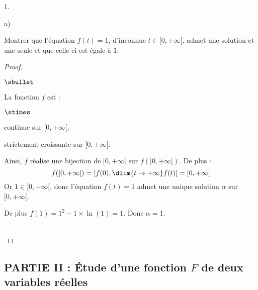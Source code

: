 \documentclass[11pt]{article}%
\begin{document}
\begin{noliste}{1.}
\begin{noliste}{a)}
\end{noliste}

\item Montrer que l'équation $f(t)=1$, d'inconnue $t\in[0,+\infty[$, 
admet une solution et une seule et que celle-ci est égale à $1$.

\begin{proof}~%
  \begin{noliste}{$\sbullet$}
  \item La fonction $f$ est :
    \begin{noliste}{$\stimes$}
    \item continue sur $[0,+\infty[$,
    \item strictement croissante sur $[0,+\infty[$.
    \end{noliste}
    Ainsi, $f$ réalise une bijection de $[0,+\infty[$ sur
    $f([0,+\infty[)$. De plus :
    \[
    f([0,+\infty[) = \left[f(0), \dlim{t\to+\infty} f(t)\right[
    =[0,+\infty[
    \]
    Or $1\in [0, +\infty[$, donc l'équation $f(t)=1$ admet une unique
    solution $\alpha$ sur $[0,+\infty[$.
    
  \item De plus $f(1)=1^2-1\times \ln(1)=1$. Donc $\alpha=1$.
  \end{noliste}
  \conc{L'équation $f(t)=1$ admet $1$ comme unique solution sur
    $[0,+\infty[$.}
  ~\\[-1.4cm]
\end{proof}

\end{noliste}




\subsection*{PARTIE II : Étude d'une fonction $F$ de deux 
variables réelles}
\end{document}
